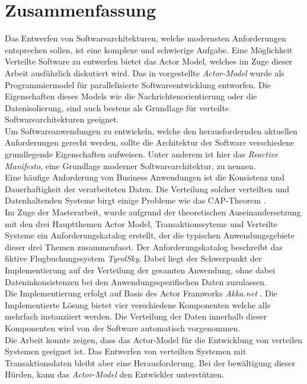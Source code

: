 \chapter*{Zusammenfassung}
Das Entwerfen von Softwarearchitekturen, welche modernsten Anforderungen entsprechen sollen, ist eine komplexe und schwierige Aufgabe. Eine Möglichkeit Verteilte Software zu entwerfen bietet das Actor Model, welches im Zuge dieser Arbeit ausführlich diskutiert wird. Das in \cite{Hewitt1973AIntelligence} vorgestellte \textit{Actor-Model} wurde als Programmiermodel für parallelisierte Softwareentwicklung entworfen. Die Eigenschaften dieses Models wie die Nachrichtenorientierung oder die Datenisolierung, sind auch bestens als Grundlage für verteilte Softwarearchitekturen geeignet. \\
Um Softwareanwendungen zu entwickeln, welche den herausfordernden aktuellen Anforderungen gerecht werden, sollte die Architektur der Software verschiedene grundlegende Eigenschaften aufweisen. Unter anderem ist hier das \textit{Reactive Manifesto}, eine Grundlage moderner Softwarearchitektur, zu nennen. 
\\
Eine häufige Anforderung von Business Anwendungen ist die Konsistenz und Dauerhaftigkeit der verarbeiteten Daten. Die Verteilung solcher verteilten und Datenhaltenden Systeme birgt einige Probleme wie das CAP-Theorem \citep{gilbertPerspectiveCAPTheorem2012}. 
\\
Im Zuge der Masterarbeit, wurde aufgrund der theoretischen Auseinandersetzung mit den drei Hauptthemen Actor Model, Transaktionssyteme und Verteilte Systeme ein Anforderungskatalog erstellt, der die typischen Anwendungsgebiete dieser drei Themen zusammenfasst. Der Anforderungskatalog beschreibt das fiktive Flugbuchungssystem \textit{TyrolSky}. Dabei liegt der Schwerpunkt der Implementierung auf der Verteilung der gesamten Anwendung, ohne dabei Dateninkonsistenzen bei den Anwendungsspezifischen Daten zuzulassen. 
\\
Die Implementierung erfolgt auf Basis des Actor Framworks \textit{Akka.net} \citep{Akka.netCommunityAkka.NETDocumentation}. Die Implementierte Lösung bietet vier verschiedene Komponenten welche alle mehrfach instanziiert werden. Die Verteilung der Daten innerhalb dieser Komponenten wird von der Software automatisch vorgenommen. 
\\
Die Arbeit konnte zeigen, dass das Actor-Model für die Entwicklung von verteilen Systemen geeignet ist. Das Entwerfen von verteilten Systemen mit Transaktionsdaten bleibt aber eine Herausforderung. Bei der bewältigung dieser Hürden, kann das \textit{Actor-Model} den Entwickler unterstützen.

\cleardoublepage
